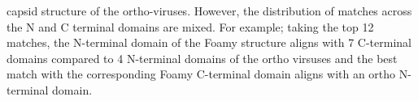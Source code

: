 capsid structure of the ortho-viruses.   However, the distribution of matches across the N and
C terminal domains are mixed.   For example; taking the top 12 matches, the N-terminal domain of the Foamy
structure aligns with 7 C-terminal domains compared to 4 N-terminal domains of the ortho virsuses
and the best match with the corresponding Foamy C-terminal domain aligns with an ortho N-terminal domain.
%
% 
